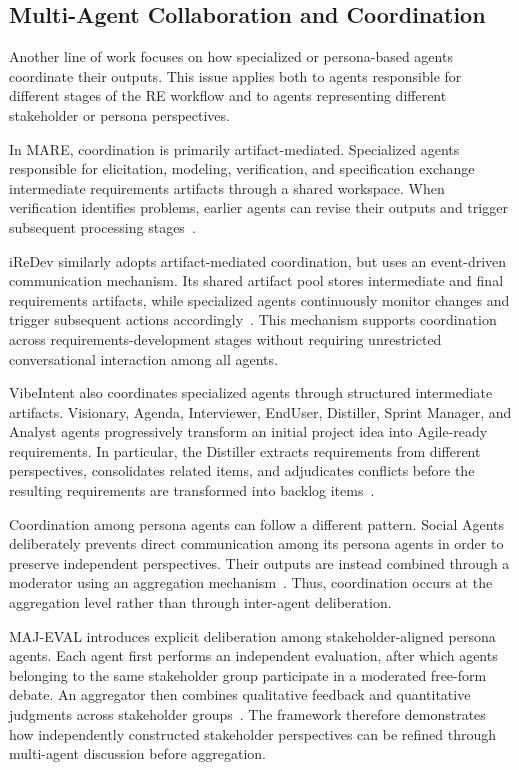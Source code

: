 \subsection{Multi-Agent Collaboration and Coordination}
\label{sec:rw-coordination}

Another line of work focuses on how specialized or persona-based agents coordinate their outputs. This issue applies both to agents responsible for different stages of the RE workflow and to agents representing different stakeholder or persona perspectives.

In MARE, coordination is primarily artifact-mediated. Specialized agents responsible for elicitation, modeling, verification, and specification exchange intermediate requirements artifacts through a shared workspace. When verification identifies problems, earlier agents can revise their outputs and trigger subsequent processing stages~\cite{mare2024}.

iReDev similarly adopts artifact-mediated coordination, but uses an event-driven communication mechanism. Its shared artifact pool stores intermediate and final requirements artifacts, while specialized agents continuously monitor changes and trigger subsequent actions accordingly~\cite{jin2025iredev}. This mechanism supports coordination across requirements-development stages without requiring unrestricted conversational interaction among all agents.

VibeIntent also coordinates specialized agents through structured intermediate artifacts. Visionary, Agenda, Interviewer, EndUser, Distiller, Sprint Manager, and Analyst agents progressively transform an initial project idea into Agile-ready requirements. In particular, the Distiller extracts requirements from different perspectives, consolidates related items, and adjudicates conflicts before the resulting requirements are transformed into backlog items~\cite{vibeintent2026}.

Coordination among persona agents can follow a different pattern. Social Agents deliberately prevents direct communication among its persona agents in order to preserve independent perspectives. Their outputs are instead combined through a moderator using an aggregation mechanism~\cite{bhattacharyya2026social}. Thus, coordination occurs at the aggregation level rather than through inter-agent deliberation.

MAJ-EVAL introduces explicit deliberation among stakeholder-aligned persona agents. Each agent first performs an independent evaluation, after which agents belonging to the same stakeholder group participate in a moderated free-form debate. An aggregator then combines qualitative feedback and quantitative judgments across stakeholder groups~\cite{chen2026majeval}. The framework therefore demonstrates how independently constructed stakeholder perspectives can be refined through multi-agent discussion before aggregation.

